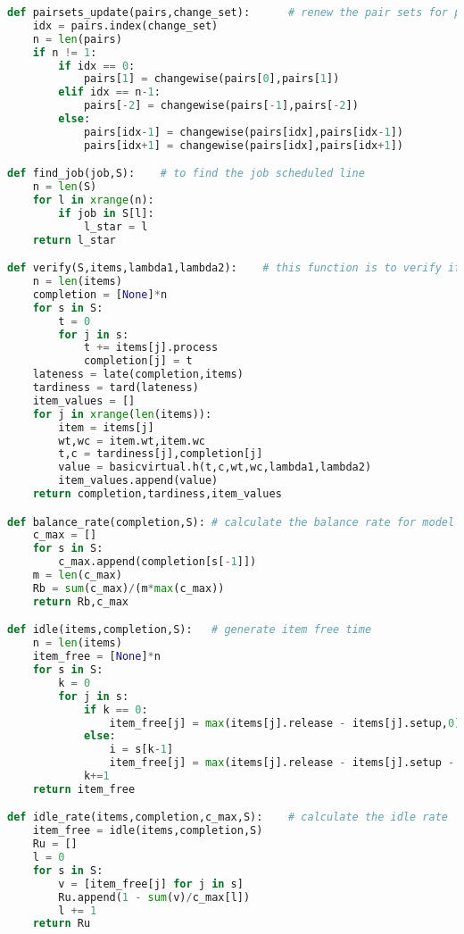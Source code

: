 \begin{lstlisting}[language = Python]
def pairsets_update(pairs,change_set):		# renew the pair sets for prograssing
	idx = pairs.index(change_set)
	n = len(pairs)
	if n != 1:
		if idx == 0:
			pairs[1] = changewise(pairs[0],pairs[1])
		elif idx == n-1:
			pairs[-2] = changewise(pairs[-1],pairs[-2])
		else:
			pairs[idx-1] = changewise(pairs[idx],pairs[idx-1])
			pairs[idx+1] = changewise(pairs[idx],pairs[idx+1])

def find_job(job,S):	# to find the job scheduled line
	n = len(S)
	for l in xrange(n):
		if job in S[l]:
			l_star = l
	return l_star

def verify(S,items,lambda1,lambda2):	# this function is to verify if the algorithm is right
	n = len(items)
	completion = [None]*n
	for s in S:
		t = 0
		for j in s:
			t += items[j].process
			completion[j] = t
	lateness = late(completion,items)
	tardiness = tard(lateness)
	item_values = []
	for j in xrange(len(items)):
		item = items[j]
		wt,wc = item.wt,item.wc
		t,c = tardiness[j],completion[j]
		value = basicvirtual.h(t,c,wt,wc,lambda1,lambda2)
		item_values.append(value)
	return completion,tardiness,item_values

def balance_rate(completion,S):	# calculate the balance rate for model 2
	c_max = []
	for s in S:
		c_max.append(completion[s[-1]])
	m = len(c_max)
	Rb = sum(c_max)/(m*max(c_max))
	return Rb,c_max

def idle(items,completion,S):	# generate item free time
	n = len(items)
	item_free = [None]*n
	for s in S:
		k = 0
		for j in s:
			if k == 0:
				item_free[j] = max(items[j].release - items[j].setup,0)
			else:
				i = s[k-1]
				item_free[j] = max(items[j].release - items[j].setup - completion[i] ,0)
			k+=1
	return item_free

def idle_rate(items,completion,c_max,S):	# calculate the idle rate
	item_free = idle(items,completion,S)
	Ru = []
	l = 0
	for s in S:
		v = [item_free[j] for j in s]
		Ru.append(1 - sum(v)/c_max[l])
		l += 1
	return Ru
\end{lstlisting}